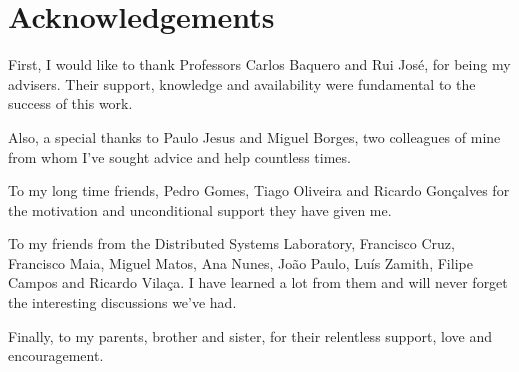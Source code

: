 \chapter*{Acknowledgements}

First, I would like to thank Professors Carlos Baquero and Rui José,
for being my advisers. Their support, knowledge and availability were
fundamental to the success of this work.

Also, a special thanks to Paulo Jesus and Miguel Borges, two colleagues
of mine from whom I've sought advice and help countless times.

To my long time friends, Pedro Gomes, Tiago Oliveira and Ricardo
Gonçalves for the motivation and unconditional support they have given
me.

To my friends from the Distributed Systems Laboratory, Francisco Cruz,
Francisco Maia, Miguel Matos, Ana Nunes, João Paulo, Luís Zamith,
Filipe Campos and Ricardo Vilaça. I have learned a lot from them and
will never forget the interesting discussions we've had.

Finally, to my parents, brother and sister, for their relentless
support, love and encouragement.

\thispagestyle{empty}
